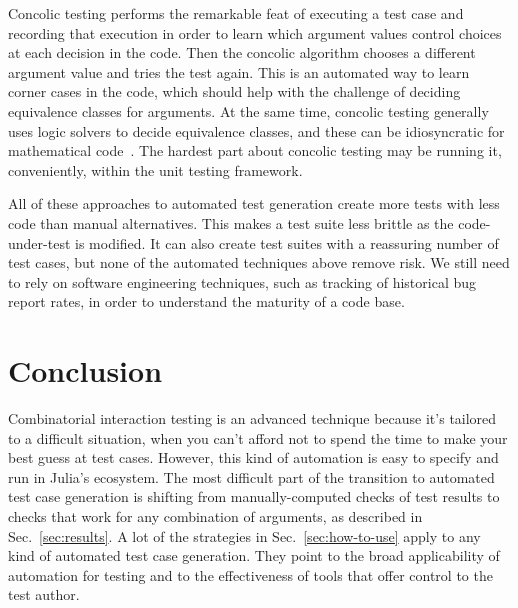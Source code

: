 \documentclass{juliacon}
\begin{document}
\vskip 6pt
Concolic testing performs the remarkable feat of executing a test case and recording that execution in order to learn which argument values control choices at each decision in the code. Then the concolic algorithm chooses a different argument value and tries the test again. This is an automated way to learn corner cases in the code, which should help with the challenge of deciding equivalence classes for arguments. At the same time, concolic testing generally uses logic solvers to decide equivalence classes, and these can be idiosyncratic for mathematical code~\cite{King1976-jt,Wang2018-xh}. The hardest part about concolic testing may be running it, conveniently, within the unit testing framework.

\vskip 6pt
All of these approaches to automated test generation create more tests with less code than manual alternatives. This makes a test suite less brittle as the code-under-test is modified. It can also create test suites with a reassuring number of test cases, but none of the automated techniques above remove risk. We still need to rely on software engineering techniques, such as tracking of historical bug report rates, in order to understand the maturity of a code base.

\section{Conclusion}
Combinatorial interaction testing is an advanced technique because it's tailored to a difficult situation, when you can't afford not to spend the time to make your best guess at test cases. However, this kind of automation is easy to specify and run in Julia's ecosystem. The most difficult part of the transition to automated test case generation is shifting from manually-computed checks of test results to checks that work for any combination of arguments, as described in Sec.~\ref{sec:results}. A lot of the strategies in Sec.~\ref{sec:how-to-use} apply to any kind of automated test case generation. They point to the broad applicability of automation for testing and to the effectiveness of tools that offer control to the test author.


\end{document}
